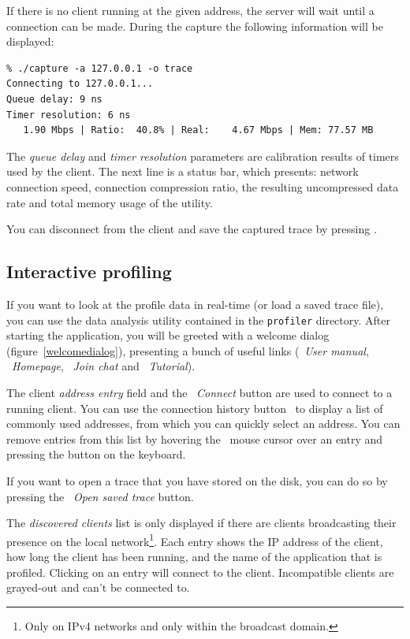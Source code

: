 \documentclass[hidelinks,titlepage,a4paper]{article}
\begin{document}
If there is no client running at the given address, the server will wait until a connection can be made. During the capture the following information will be displayed:

\begin{verbatim}
% ./capture -a 127.0.0.1 -o trace
Connecting to 127.0.0.1...
Queue delay: 9 ns
Timer resolution: 6 ns
   1.90 Mbps | Ratio:  40.8% | Real:    4.67 Mbps | Mem: 77.57 MB
\end{verbatim}

The \emph{queue delay} and \emph{timer resolution} parameters are calibration results of timers used by the client. The next line is a status bar, which presents: network connection speed, connection compression ratio, the resulting uncompressed data rate and total memory usage of the utility.

You can disconnect from the client and save the captured trace by pressing .

\subsection{Interactive profiling}
\label{interactiveprofiling}

If you want to look at the profile data in real-time (or load a saved trace file), you can use the data analysis utility contained in the \texttt{profiler} directory. After starting the application, you will be greeted with a welcome dialog (figure~\ref{welcomedialog}), presenting a bunch of useful links (\faBook{}~\emph{User manual}, \faGlobeAmericas{}~\emph{Homepage}, \faComment~\emph{Join chat} and \faVideo{}~\emph{Tutorial}).

The client \emph{address entry} field and the \faWifi{}~\emph{Connect} button are used to connect to a running client. You can use the connection history button~\faCaretDown{} to display a list of commonly used addresses, from which you can quickly select an address. You can remove entries from this list by hovering the \faMousePointer{}~mouse cursor over an entry and pressing the \keys{\del} button on the keyboard.

If you want to open a trace that you have stored on the disk, you can do so by pressing the \faFolderOpen{}~\emph{Open saved trace} button.

The \emph{discovered clients} list is only displayed if there are clients broadcasting their presence on the local network\footnote{Only on IPv4 networks and only within the broadcast domain.}. Each entry shows the IP address of the client, how long the client has been running, and the name of the application that is profiled. Clicking on an entry will connect to the client. Incompatible clients are grayed-out and can't be connected to.
\end{document}

